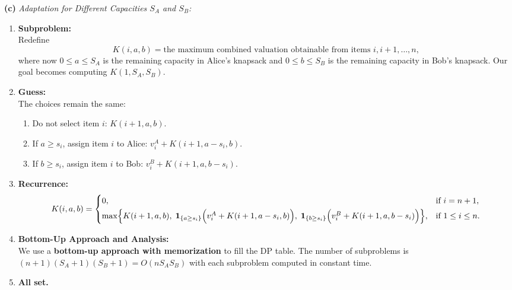 \documentclass[11pt]{article}
\begin{document}
    \medskip
    
    \textbf{(c)} \emph{Adaptation for Different Capacities \(S_A\) and \(S_B\):}
    
    \begin{enumerate}
        \item \textbf{Subproblem:}\\
        Redefine 
        \[
        K(i,a,b)= \text{the maximum combined valuation obtainable from items } i,i+1,\dots,n,
        \]
        where now \(0\le a\le S_A\) is the remaining capacity in Alice's knapsack and \(0\le b\le S_B\) is the remaining capacity in Bob's knapsack. Our goal becomes computing \(K(1,S_A,S_B)\).
    
        \item \textbf{Guess:}\\
        The choices remain the same:
        \begin{enumerate}
            \item Do not select item \(i\): \(K(i+1,a,b)\).
            \item If \(a\ge s_i\), assign item \(i\) to Alice: \(v_i^A+K(i+1,a-s_i,b)\).
            \item If \(b\ge s_i\), assign item \(i\) to Bob: \(v_i^B+K(i+1,a,b-s_i)\).
        \end{enumerate}
    
        \item \textbf{Recurrence:}\\[1mm]
        \[
        K(i,a,b)=
        \begin{cases}
        0, & \text{if } i=n+1,\\[1mm]
        \max \Bigl\{ K(i+1,a,b), \; 
        \mathbf{1}_{\{a\ge s_i\}}\Bigl(v_i^A+K(i+1,a-s_i,b)\Bigr), \; 
        \mathbf{1}_{\{b\ge s_i\}}\Bigl(v_i^B+K(i+1,a,b-s_i)\Bigr) \Bigr\}, & \text{if } 1\le i\le n.
        \end{cases}
        \]
    
        \item \textbf{Bottom-Up Approach and Analysis:}\\[1mm]
        We use a \textbf{bottom-up approach with memorization} to fill the DP table. The number of subproblems is \((n+1)(S_A+1)(S_B+1)=O(nS_A S_B)\) with each subproblem computed in constant time.
    
        \item \textbf{All set.}
    \end{enumerate}
    \newpage
\end{document}
